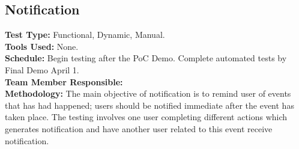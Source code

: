 \documentclass[12pt]{article}
\begin{document}
\subsection{Notification}
\textbf{Test Type:} Functional, Dynamic, Manual. \\
\textbf{Tools Used:} None. \\
\textbf{Schedule:} Begin testing after the PoC Demo. Complete automated tests by Final Demo April 1. \\
\textbf{Team Member Responsible:} \\
\textbf{Methodology:} The main objective of notification is to remind user of events that has had happened; users should be notified immediate after the event has taken place. The testing involves one user completing different actions which generates notification and have another user related to this event receive notification.
\end{document}

